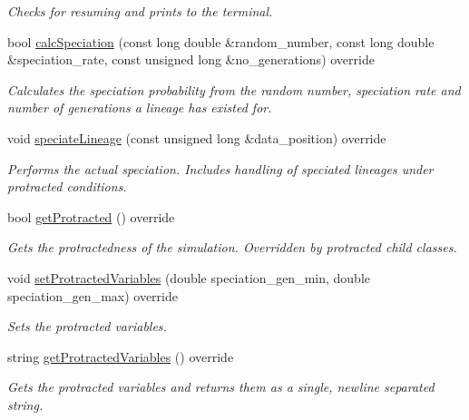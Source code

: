 \begin{DoxyCompactItemize}
\begin{DoxyCompactList}\small\item\em Checks for resuming and prints to the terminal. \end{DoxyCompactList}\item 
bool \hyperlink{class_protracted_tree_af9690f122e77c0a60d363af3e818c9a2}{calc\+Speciation} (const long double \&random\+\_\+number, const long double \&speciation\+\_\+rate, const unsigned long \&no\+\_\+generations) override
\begin{DoxyCompactList}\small\item\em Calculates the speciation probability from the random number, speciation rate and number of generations a lineage has existed for. \end{DoxyCompactList}\item 
void \hyperlink{class_protracted_tree_aaa2f1db86b0fd49a69d0809bd1c1fb81}{speciate\+Lineage} (const unsigned long \&data\+\_\+position) override
\begin{DoxyCompactList}\small\item\em Performs the actual speciation. Includes handling of speciated lineages under protracted conditions. \end{DoxyCompactList}\item 
bool \hyperlink{class_protracted_tree_ab0bb05fbdeb2aa75a3d3128ded3d655b}{get\+Protracted} () override
\begin{DoxyCompactList}\small\item\em Gets the protractedness of the simulation. Overridden by protracted child classes. \end{DoxyCompactList}\item 
void \hyperlink{class_protracted_tree_a6e04aa92dd30e889a468d9b9fc6fd58d}{set\+Protracted\+Variables} (double speciation\+\_\+gen\+\_\+min, double speciation\+\_\+gen\+\_\+max) override
\begin{DoxyCompactList}\small\item\em Sets the protracted variables. \end{DoxyCompactList}\item 
string \hyperlink{class_protracted_tree_af0eca5eb2a790fcee9a0854e30088753}{get\+Protracted\+Variables} () override
\begin{DoxyCompactList}\small\item\em Gets the protracted variables and returns them as a single, newline separated string. \end{DoxyCompactList}\item 

\end{DoxyCompactItemize}

